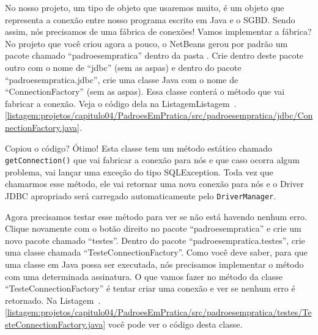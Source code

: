 No nosso projeto, um tipo de objeto que usaremos muito, é um objeto que representa a conexão entre nosso programa escrito em Java e o SGBD. Sendo assim, nós precisamos de uma fábrica de conexões! Vamos implementar a fábrica? No projeto que você criou agora a pouco, o NetBeans gerou por padrão um pacote chamado ``padroesempratica'' dentro da pasta . Crie dentro deste pacote outro com o nome de ``jdbc'' (sem as aspas) e dentro do pacote ``padroesempratica.jdbc'', crie uma classe Java com o nome de ``ConnectionFactory'' (sem as aspas). Essa classe conterá o método que vai fabricar a conexão. Veja o código dela na ListagemListagem~\thechapter.\ref{listagem:projetos/capitulo04/PadroesEmPratica/src/padroesempratica/jdbc/ConnectionFactory.java}.


Copiou o código? Ótimo! Esta classe tem um método estático chamado \texttt{getConnection()} que vai fabricar a conexão para nós e que caso ocorra algum problema, vai lançar uma exceção do tipo SQLException. Toda vez que chamarmos esse método, ele vai retornar uma nova conexão para nós e o Driver JDBC apropriado será carregado automaticamente pelo \texttt{DriverManager}. 

Agora precisamos testar esse método para ver se não está havendo nenhum erro. Clique novamente com o botão direito no pacote ``padroesempratica'' e crie um novo pacote chamado ``testes''. Dentro do pacote ``padroesempratica.testes'', crie uma classe chamada ``TesteConnectionFactory''. Como você deve saber, para que uma classe em Java possa ser executada, nós precisamos implementar o método  com uma determinada assinatura. O que vamos fazer no método  da classe ``TesteConnectionFactory'' é tentar criar uma conexão e ver se nenhum erro é retornado. Na Listagem~\thechapter.\ref{listagem:projetos/capitulo04/PadroesEmPratica/src/padroesempratica/testes/TesteConnectionFactory.java} você pode ver o código desta classe.


